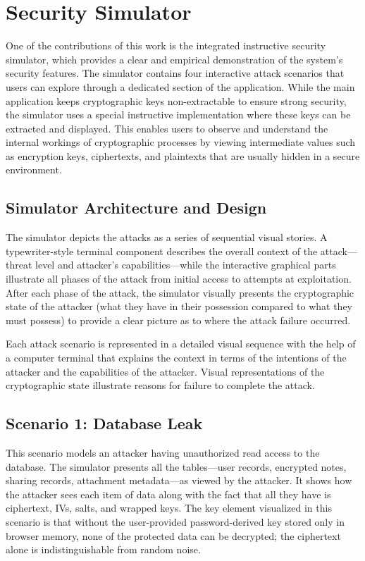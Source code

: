 \documentclass[conference]{IEEEtran}
\begin{document}
\section{Security Simulator}

One of the contributions of this work is the integrated instructive security simulator, which provides a clear and empirical demonstration of the system's security features. The simulator contains four interactive attack scenarios that users can explore through a dedicated section of the application. While the main application keeps cryptographic keys non-extractable to ensure strong security, the simulator uses a special instructive implementation where these keys can be extracted and displayed. This enables users to observe and understand the internal workings of cryptographic processes by viewing intermediate values such as encryption keys, ciphertexts, and plaintexts that are usually hidden in a secure environment.

\subsection{Simulator Architecture and Design}

The simulator depicts the attacks as a series of sequential visual stories. A typewriter-style terminal component describes the overall context of the attack---threat level and attacker's capabilities---while the interactive graphical parts illustrate all phases of the attack from initial access to attempts at exploitation. After each phase of the attack, the simulator visually presents the cryptographic state of the attacker (what they have in their possession compared to what they must possess) to provide a clear picture as to where the attack failure occurred.

Each attack scenario is represented in a detailed visual sequence with the help of a computer terminal that explains the context in terms of the intentions of the attacker and the capabilities of the attacker. Visual representations of the cryptographic state illustrate reasons for failure to complete the attack.

\subsection{Scenario 1: Database Leak}

This scenario models an attacker having unauthorized read access to the database. The simulator presents all the tables---user records, encrypted notes, sharing records, attachment metadata---as viewed by the attacker. It shows how the attacker sees each item of data along with the fact that all they have is ciphertext, IVs, salts, and wrapped keys. The key element visualized in this scenario is that without the user-provided password-derived key stored only in browser memory, none of the protected data can be decrypted; the ciphertext alone is indistinguishable from random noise.
\end{document}
